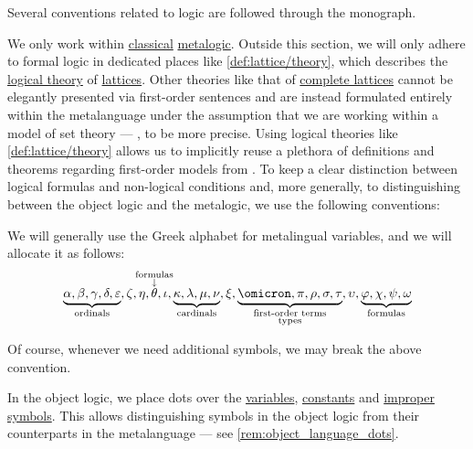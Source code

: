 \begin{remark}\label{rem:mathematical_logic_conventions}
  Several conventions related to logic are followed through the monograph.

  We only work within \hyperref[con:classical_logic]{classical} \hyperref[con:metalogic]{metalogic}. Outside this section, we will only adhere to formal logic in dedicated places like \cref{def:lattice/theory}, which describes the \hyperref[def:logical_theory]{logical theory} of \hyperref[def:lattice]{lattices}. Other theories like that of \hyperref[def:complete_lattice]{complete lattices} cannot be elegantly presented via first-order sentences and are instead formulated entirely within the metalanguage under the assumption that we are working within a model of set theory --- \hyperref[def:axiom_of_universes]{}, to be more precise. Using logical theories like \cref{def:lattice/theory} allows us to implicitly reuse a plethora of definitions and theorems regarding first-order models from . To keep a clear distinction between logical formulas and non-logical conditions and, more generally, to distinguishing between the object logic and the metalogic, we use the following conventions:

  \begin{thmenum}
     We will generally use the Greek alphabet for metalingual variables, and we will allocate it as follows:
    \begin{equation*}
      \underbrace{\alpha, \beta, \gamma, \delta, \varepsilon}_{\T{ordinals}},
      \zeta, \eta,
      \overset{ \mathclap{ \substack{ \T{formulas} \\ \downarrow } } }{\theta},
      \iota,
      \underbrace{\kappa, \lambda, \mu, \nu}_{\T{cardinals}},
      \xi,
      \underbrace{\omicron, \pi, \rho, \sigma, \tau}_{\substack{\T{first-order terms} \\ \T{types}}},
      \upsilon,
      \underbrace{\varphi, \chi, \psi, \omega}_{\T{formulas}}
    \end{equation*}

    Of course, whenever we need additional symbols, we may break the above convention.

     In the object logic, we place dots over the \hyperref[con:variable]{variables}, \hyperref[con:variable]{constants} and \hyperref[con:improper_symbol]{improper symbols}. This allows distinguishing symbols in the object logic from their counterparts in the metalanguage --- see \cref{rem:object_language_dots}.


\end{thmenum}
\end{remark}
